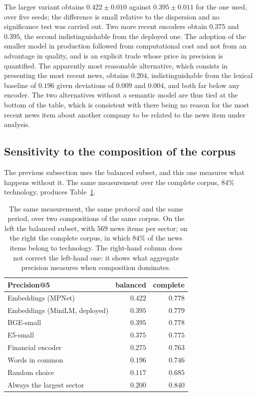 The larger variant obtains $0.422 \pm 0.010$ against $0.395 \pm 0.011$ for the one used, over five
seeds; the difference is small relative to the dispersion and no significance test was carried out.
Two more recent encoders obtain $0.375$ and $0.395$, the second indistinguishable from the deployed
one. The
adoption of the smaller model in production followed from computational cost and not from an
advantage in quality, and is an explicit trade whose price in precision is quantified. The
apparently most reasonable alternative, which consists in presenting the most recent news, obtains
$0.204$, indistinguishable from the lexical baseline of $0.196$ given deviations of $0.009$ and
$0.004$, and both far below any encoder. The two alternatives without a semantic model are thus
tied at the bottom of the table, which is consistent with there being no reason for the most
recent news item about another company to be related to the news item under analysis.

\subsection{Sensitivity to the composition of the corpus}
\label{sec:av_composicao}

The previous subsection uses the balanced subset, and this one measures what happens without it.
The same measurement over the complete corpus, $84\%$ technology, produces
Table~\ref{tab:av_composicao}.

\begin{table}[htbp]
\centering
\small
\caption[Aggregate precision under two compositions of the same corpus]{The same measurement, the
same protocol and the same period, over two compositions of the same corpus. On the left the
balanced subset, with $569$ news items per sector; on the right the complete corpus, in which
$84\%$ of the news items belong to technology. The right-hand column does not correct the
left-hand one: it shows what aggregate precision measures when composition dominates.}
\label{tab:av_composicao}
\begin{tabular}{lrr}
\toprule
Precision@5 & balanced & complete \\
\midrule
Embeddings (MPNet)              & $0.422$ & $0.778$ \\
Embeddings (MiniLM, deployed)   & $0.395$ & $0.779$ \\
BGE-small                       & $0.395$ & $0.778$ \\
E5-small                        & $0.375$ & $0.775$ \\
Financial encoder               & $0.275$ & $0.763$ \\
Words in common                 & $0.196$ & $0.746$ \\
Random choice                   & $0.117$ & $0.685$ \\
\midrule
Always the largest sector       & $0.200$ & $\mathbf{0.840}$ \\
\bottomrule
\end{tabular}
\end{table}

